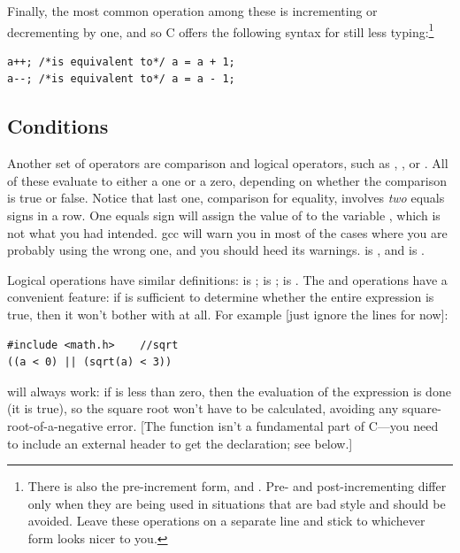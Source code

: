 \documentclass[12pt]{article}
\makeatletter
\def\cindex#1{\index{#1@\cinline{#1}}}
\makeatother
\begin{document}
Finally, the most common operation among these is incrementing or decrementing by one, and so C offers the
following syntax for still less typing:\footnote{There is also the pre-increment form,  and
. Pre- and post-incrementing differ only when they are being used in situations that are bad style and should
be avoided. Leave these operations on a separate line and stick to whichever form looks nicer to you.} \\
\begin{lstlisting}
a++; /*is equivalent to*/ a = a + 1;
a--; /*is equivalent to*/ a = a - 1;
\end{lstlisting}



\subsection{Conditions} 	
\label{forloops}    
\cindex{<} \cindex{>} \cindex{==}
Another set of operators are comparison and logical operators, such as ,
, or . All of these evaluate to either a one or a zero, depending on whether the
comparison is true or false. Notice that last one, comparison for equality, involves {\sl two} equals
signs in a row. One equals sign  will assign the value of  to the variable , which is not what
you had intended. gcc will warn you in most of the cases where you are
probably using the wrong one, and you should heed its warnings.  is , and  is .

Logical operations have similar definitions: \cindex{\&\&} \cindex{"|"|} 
  
 is ;  is ;  is .
The \cinline{\&\&} and \cinline{||} operations have a convenient feature: if  is sufficient to determine whether
the entire expression is true, then it won't bother with  at all. For example [just ignore the  lines for now]:
\begin{lstlisting}
#include <math.h>    //sqrt
((a < 0) || (sqrt(a) < 3))
\end{lstlisting}
will always work: if  is less than zero, then the evaluation
of the expression is done (it is true), so the square root won't have
to be calculated, avoiding any square-root-of-a-negative error. 
[The  function isn't a fundamental part of C---you
need to include an external header to get the declaration; see below.]
\end{document}
